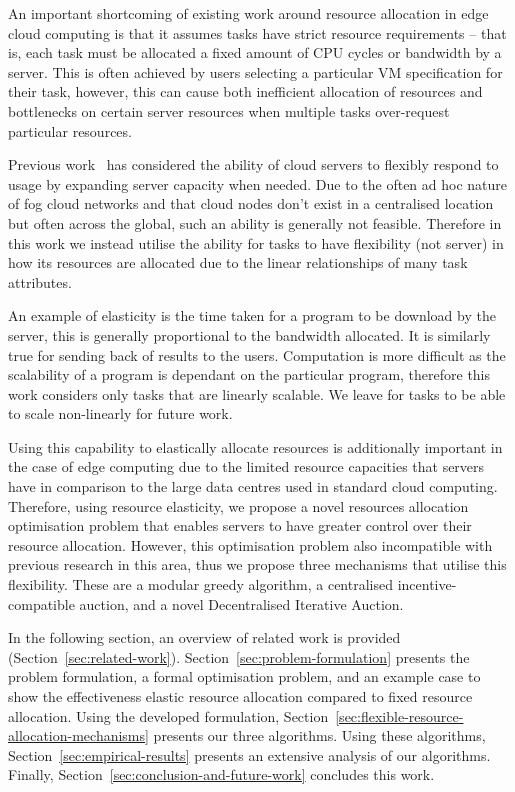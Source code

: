 An important shortcoming of existing work around resource allocation in edge cloud computing is that it assumes tasks
have strict resource requirements -- that is, each task must be allocated a fixed amount of CPU cycles or bandwidth by a
server. This is often achieved by users selecting a particular VM specification for their task, however, this can cause
both inefficient allocation of resources and bottlenecks on certain server resources when multiple tasks over-request
particular resources.

Previous work~\cite{ServerElasticity} has considered the ability of cloud servers to flexibly respond to usage by
expanding server capacity when needed. Due to the often ad hoc nature of fog cloud networks and that cloud nodes don't
exist in a centralised location but often across the global, such an ability is generally not feasible. Therefore in
this work we instead utilise the ability for tasks to have flexibility (not server) in how its resources are allocated
due to the linear relationships of many task attributes.

An example of elasticity is the time taken for a program to be download by the server, this is generally proportional
to the bandwidth allocated. It is similarly true for sending back of results to the users. Computation is more
difficult as the scalability of a program is dependant on the particular program, therefore this
work considers only tasks that are linearly scalable. We leave for tasks to be able to scale non-linearly for future
work.

Using this capability to elastically allocate resources is additionally important in the case of edge computing due to
the limited resource capacities that servers have in comparison to the large data centres used in standard cloud
computing. Therefore, using resource elasticity, we propose a novel resources allocation optimisation problem that
enables servers to have greater control over their resource allocation. However, this optimisation problem also
incompatible with previous research in this area, thus we propose three mechanisms that utilise this flexibility. These
are a modular greedy algorithm, a centralised incentive-compatible auction, and a novel Decentralised Iterative Auction.

In the following section, an overview of related work is provided (Section~\ref{sec:related-work}).
Section~\ref{sec:problem-formulation} presents the problem formulation, a formal optimisation problem, and an example
case to show the effectiveness elastic resource allocation compared to fixed resource allocation. Using the developed
formulation, Section~\ref{sec:flexible-resource-allocation-mechanisms} presents our three algorithms. Using these
algorithms, Section~\ref{sec:empirical-results} presents an extensive analysis of our algorithms. Finally,
Section~\ref{sec:conclusion-and-future-work} concludes this work.
